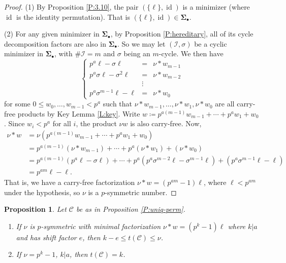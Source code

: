\documentclass{amsart}
\numberwithin{equation}{section}
\newcommand{\bSig}{\mathbf\Sigma}
\newcommand{\Sb}{\bSig_\bullet}
\newcommand{\cC}{\mathcal{C}}
\newcommand{\cI}{\mathcal{I}}
\DeclareMathOperator{\id}{id}
\theoremstyle{plain}
\newtheorem{proposition}[theorem]{Proposition}
\theoremstyle{definition}
\begin{document}
\begin{proof}
(1) 
By Proposition \ref{P:3.10}, the pair $(\{\ell\},\id)$
is a minimizer (where $\id$ is the identity permutation). 
That is $(\{\ell\},\id)\in \Sb$.  

(2) 
For any given minimizer in $\Sb$,
by Proposition \ref{P:hereditary}, all of its cycle decomposition factors
are also in $\Sb$.
So we may let  $(\cI,\sigma)$ be a cyclic minimizer in $\Sb$,
with $\#\cI=m$ and $\sigma$ being an $m$-cycle.   
We then have
$$\left\{
\begin{array}{rcl}
p^a\ell-\sigma\ell&=& \nu *w_{m-1}\\
p^a\sigma\ell-\sigma^2\ell &=& \nu *w_{m-2}\\
&\vdots &\\
p^a\sigma^{m-1}\ell-\ell &=& \nu *w_0
\end{array}\right.
$$
for some $0\le w_0,\ldots,w_{m-1} < p^a$ such that 
$\nu * w_{m-1}, \ldots, \nu *w_1, \nu *w_0$ are all carry-free products by Key Lemma \ref{L:key}.
Write $w\coloneqq p^{a(m-1)}w_{m-1}+\cdots +p^a w_1+w_0$. 
Since $w_i<p^a$ for all $i$, 
the product $\nu w$ is also carry-free.
Now,
\begin{align*}
\nu * w &=\nu (p^{a(m-1)}w_{m-1}+\cdots +p^a w_1 + w_0) \\
     &=p^{a(m-1)}(\nu *w_{m-1})+\cdots +p^a(\nu *w_1)+(\nu *w_0)\\
     &=p^{a(m-1)}(p^a\ell-\sigma\ell)+ \cdots +p^a(p^a\sigma^{m-2}\ell-\sigma^{m-1}\ell)+(p^a\sigma^{m-1}\ell-\ell)\\
     &=p^{am}\ell -\ell.
\end{align*}
That is, we have a carry-free factorization $\nu * w = (p^{am}-1)\ell$, where 
$\ell <p^{am}$ under the hypothesis,
so $\nu$ is a $p$-symmetric number.
\end{proof}

\begin{proposition}
\label{P:bounded_min2}
Let $\cC$ be as in Proposition \ref{P:uniq-perm}.
\begin{enumerate}
\item
If $\nu$ is $p$-symmetric with minimal factorization 
$\nu * w = (p^k-1)\ell$ where $k|a$ and has shift factor $e$,  
then $k-e\le t(\cC)\le \nu$. 
\item 
If $\nu=p^k-1$, $k|a$, then $t(\cC)=k$.
\end{enumerate}
\end{proposition}
\end{document}
